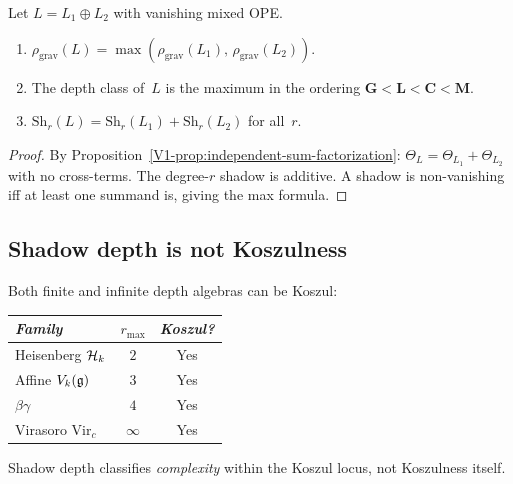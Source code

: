 \begin{theorem}
\ClaimStatusProvedHere
{}
Let $L = L_1 \oplus L_2$ with vanishing mixed OPE.
\begin{enumerate}[label=\textup{(\roman*)}]
\item $\rho_{\mathrm{grav}}(L)
 = \max(\rho_{\mathrm{grav}}(L_1),\,
 \rho_{\mathrm{grav}}(L_2))$.
\item The depth class of~$L$ is the maximum in the ordering
 $\mathbf{G} < \mathbf{L} < \mathbf{C} < \mathbf{M}$.
\item $\mathrm{Sh}_r(L) = \mathrm{Sh}_r(L_1) +
 \mathrm{Sh}_r(L_2)$ for all~$r$.
\end{enumerate}
\end{theorem}

\begin{proof}
By Proposition~\ref{V1-prop:independent-sum-factorization}:
$\Theta_L = \Theta_{L_1} + \Theta_{L_2}$ with no cross-terms.
The degree-$r$ shadow is additive. A shadow is non-vanishing
iff at least one summand is, giving the max formula.
\end{proof}



\subsection{Shadow depth is not Koszulness}

\begin{proposition}
\ClaimStatusProvedHere
{}
Both finite and infinite depth algebras can be Koszul:
\begin{center}
\small
\renewcommand{\arraystretch}{1.15}
\begin{tabular}{lcc}
\toprule
\emph{Family} & $r_{\max}$ & \emph{Koszul?} \\
\midrule
Heisenberg $\mathcal{H}_k$ & $2$ & Yes \\
Affine $V_k(\mathfrak{g})$ & $3$ & Yes \\
$\beta\gamma$ & $4$ & Yes \\
Virasoro $\mathrm{Vir}_c$ & $\infty$ & Yes \\
\bottomrule
\end{tabular}
\end{center}
Shadow depth classifies \emph{complexity} within the Koszul
locus, not Koszulness itself.
\end{proposition}

